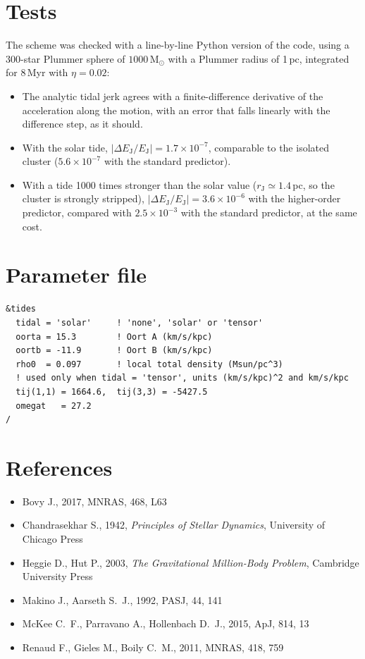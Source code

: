 \documentclass[11pt,a4paper]{article}
\begin{document}
\section{Tests}

The scheme was checked with a line-by-line Python version of the code,
using a 300-star Plummer sphere of $1000\,\mathrm{M_\odot}$ with a
Plummer radius of 1\,pc, integrated for 8\,Myr with $\eta = 0.02$:
\begin{itemize}
\item The analytic tidal jerk agrees with a finite-difference
  derivative of the acceleration along the motion, with an error that
  falls linearly with the difference step, as it should.
\item With the solar tide, $|\Delta E_{\mathrm J}/E_{\mathrm J}| =
  1.7\times10^{-7}$, comparable to the isolated cluster
  ($5.6\times10^{-7}$ with the standard predictor).
\item With a tide 1000 times stronger than the solar value
  ($r_{\mathrm J}\simeq1.4$\,pc, so the cluster is strongly stripped),
  $|\Delta E_{\mathrm J}/E_{\mathrm J}| = 3.6\times10^{-6}$ with the
  higher-order predictor, compared with $2.5\times10^{-3}$ with the
  standard predictor, at the same cost.
\end{itemize}

\section{Parameter file}

\begin{lstlisting}
&tides
  tidal = 'solar'     ! 'none', 'solar' or 'tensor'
  oorta = 15.3        ! Oort A (km/s/kpc)
  oortb = -11.9       ! Oort B (km/s/kpc)
  rho0  = 0.097       ! local total density (Msun/pc^3)
  ! used only when tidal = 'tensor', units (km/s/kpc)^2 and km/s/kpc
  tij(1,1) = 1664.6,  tij(3,3) = -5427.5
  omegat   = 27.2
/
\end{lstlisting}

\section*{References}
\begin{itemize}\setlength\itemsep{0pt}
\item Bovy J., 2017, MNRAS, 468, L63
\item Chandrasekhar S., 1942, \emph{Principles of Stellar Dynamics},
  University of Chicago Press
\item Heggie D., Hut P., 2003, \emph{The Gravitational Million-Body
  Problem}, Cambridge University Press
\item Makino J., Aarseth S.~J., 1992, PASJ, 44, 141
\item McKee C.~F., Parravano A., Hollenbach D.~J., 2015, ApJ, 814, 13
\item Renaud F., Gieles M., Boily C.~M., 2011, MNRAS, 418, 759
\end{itemize}
\end{document}

